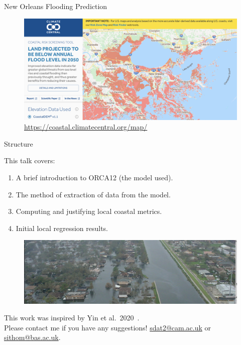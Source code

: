 \begin{frame}{New Orleans Flooding Prediction~\cite{kulp2019new, kulp2018coastaldem}}
\vspace{-20pt}
\begin{figure}[htb!]
    \centering
   \hspace{-20pt}
    \includegraphics[width=0.9\paperwidth]{images/example-images/new-orleans-surge.png}
    \vspace{-7pt}
    \caption{\url{https://coastal.climatecentral.org/map/}}
    \label{fig:}
\end{figure}
\end{frame}

\begin{frame}{Structure}

This talk covers:
\vspace{5pt}

\begin{enumerate}
    \item A brief introduction to ORCA12 (the model used).
    \item The method of extraction of data from the model.
    \item Computing and justifying local coastal metrics.
     \item Initial local regression results.
\end{enumerate}
\begin{figure}[htb!]
    \includegraphics[width=0.9\linewidth]{images/example-images/new-orleans.jpg}
\end{figure}

This work was inspired by Yin et al.~2020~\cite{ZannaPreprint}.\\
Please contact me if you have any suggestions!
\href{mailto:sdat2@cam.ac.uk}{sdat2@cam.ac.uk}
or \href{mailto:sithom@bas.ac.uk}{sithom@bas.ac.uk}.
\begin{center}
\end{center}
\end{frame}
 
